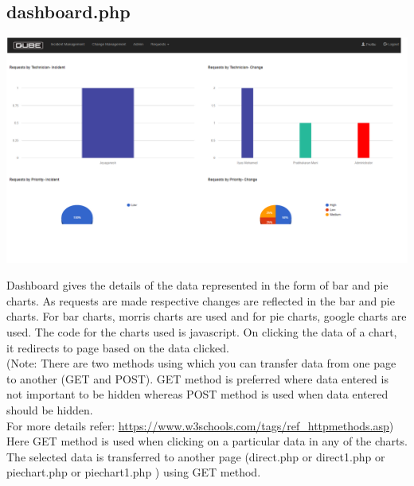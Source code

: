 \documentclass{article}
\begin{document}
\subsection{dashboard.php}
\begin{center}

    \includegraphics[width=7.0in]{dashboard.png}
   
    \label{}

\end{center}
Dashboard gives the details of the data represented in the form of bar and pie charts. As requests are made respective changes are reflected in the bar and pie charts. For bar charts, morris charts are used and for pie charts, google charts are used. The code for the charts used is javascript. On clicking the data of a chart, it redirects to page based on the data clicked.\\
\big(Note: There are two methods using which you can transfer data from one page to another (GET and POST). GET method is preferred where data entered is not important to be hidden whereas POST method is used when data entered should be hidden.\\ For more details refer: \underline{https://www.w3schools.com/tags/ref\_httpmethods.asp}\big)\\
Here GET method is used when clicking on a particular data in any of the charts. The selected data is transferred to another page (direct.php or direct1.php or piechart.php or piechart1.php ) using GET method.  
\end{document}
